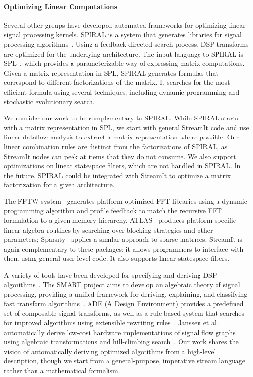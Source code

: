 \paragraph*{Optimizing Linear Computations}  Several other groups 
have developed automated frameworks for optimizing linear signal
processing kernels.  SPIRAL is a system that generates libraries for
signal processing algorithms~\cite{Spiral-SI}.  Using a
feedback-directed search process, DSP transforms are optimized for the
underlying architecture.  The input language to SPIRAL is
SPL~\cite{xiong01spl,xiong-thesis}, which provides a parameterizable
way of expressing matrix computations.  Given a matrix representation
in SPL, SPIRAL generates formulas that correspond to different
factorizations of the matrix.  It searches for the most efficient
formula using several techniques, including dynamic programming and
stochastic evolutionary search.

We consider our work to be complementary to SPIRAL.  While SPIRAL
starts with a matrix representation in SPL, we start with general
StreamIt code and use linear dataflow analysis to extract a matrix
representation where possible.  Our linear combination rules are
distinct from the factorizations of SPIRAL, as StreamIt nodes can peek
at items that they do not consume.  We also support optimizations on
linear statespace filters, which are not handled in SPIRAL.  In the
future, SPIRAL could be integrated with StreamIt to optimize a matrix
factorization for a given architecture.

The FFTW system~\cite{FFTW-SI} generates platform-optimized FFT
libraries using a dynamic programming algorithm and profile feedback
to match the recursive FFT formulation to a given memory hierarchy.
ATLAS~\cite{ATLAS,ATLAS-Sparsity-SI} produces platform-specific linear
algebra routines by searching over blocking strategies and other
parameters; Sparsity~\cite{ATLAS-Sparsity-SI,Sparsity} applies a
similar approach to sparse matrices.  StreamIt is again complementary
to these packages: it allows programmers to interface with them using
general user-level code.  It also supports linear statespace filters.

A variety of tools have been developed for specifying and deriving DSP
algorithms~\cite{oppenheim-symbolic}.  The SMART project aims to
develop an algebraic theory of signal processing, providing a unified
framework for deriving, explaining, and classifying fast transform
algorithms~\cite{SMART03}.  ADE (A Design Environment) provides a
predefined set of composable signal transforms, as well as a
rule-based system that searches for improved algorithms using
extensible rewriting rules~\cite{covell-ade}.  Janssen et al.
automatically derive low-cost hardware implementations of signal flow
graphs using algebraic transformations and hill-climbing
search~\cite{Janssen94}.  Our work shares the vision of automatically
deriving optimized algorithms from a high-level description, though we
start from a general-purpose, imperative stream language rather than a
mathematical formalism.

